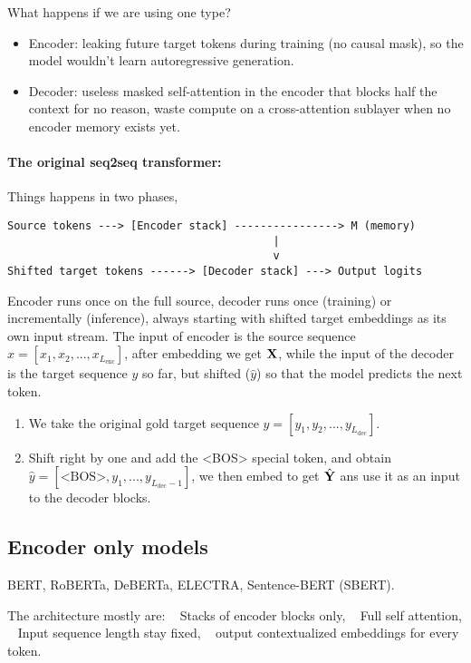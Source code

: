 \documentclass[11pt]{article}  %
\begin{document}
What happens if we are using one type?
\begin{itemize}
  \item Encoder: leaking future target tokens during training (no causal mask), so the model wouldn't learn autoregressive generation.
  \item Decoder: useless masked self-attention in the encoder that blocks half the context for no reason, waste compute on a cross-attention sublayer when no encoder memory exists yet.
\end{itemize}

\paragraph{The original seq2seq transformer:} Things happens in two phases, 
\begin{verbatim}
Source tokens ---> [Encoder stack] ----------------> M (memory)
                                         |   
                                         v
Shifted target tokens ------> [Decoder stack] ---> Output logits
\end{verbatim}
Encoder runs once on the full source, decoder runs once (training) or incrementally (inference), always starting with shifted target embeddings as its own input stream.
The input of encoder is the source sequence $x = [x_1, x_2, ..., x_{L_{\text{enc}}}]$, after embedding we get $\mathbf{X}$, while the input of the decoder is the target sequence $y$ so far, but shifted ($\hat{y}$) so that the model predicts the next token.
\begin{enumerate}
  \item We take the original gold target sequence $y = [y_1, y_2, ..., y_{L_{\text{dec}}}]$.
  \item Shift right by one and add the <BOS> special token, and obtain $\hat{y} = [\text{<BOS>}, y_1, ..., y_{L_{\text{dec}} - 1}]$, we then embed to get $\hat{\mathbf{Y}}$ ans use it as an input to the decoder blocks.
\end{enumerate}

\subsection{Encoder only models} 
BERT, RoBERTa, DeBERTa, ELECTRA, Sentence-BERT (SBERT). 

The architecture mostly are: \textbullet~ Stacks of encoder blocks only, \textbullet~ Full self attention, \textbullet~ Input sequence length stay fixed, \textbullet~ output contextualized embeddings for every token.
\end{document}
